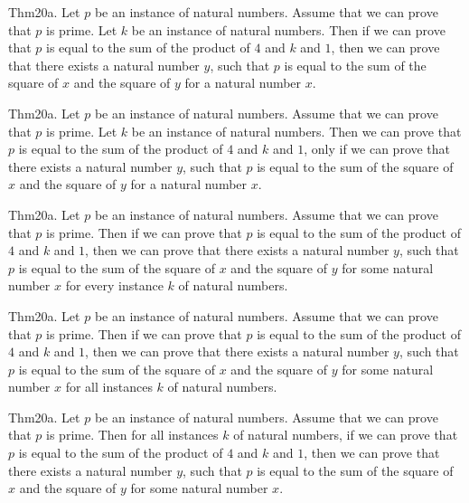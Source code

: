 \documentclass{article}
\begin{document}
Thm20a. Let $p$ be an instance of natural numbers. Assume that we can prove that $p$ is prime. Let $k$ be an instance of natural numbers. Then if we can prove that $p$ is equal to the sum of the product of $4$ and $k$ and $1$, then we can prove that there exists a natural number $y$, such that $p$ is equal to the sum of the square of $x$ and the square of $y$ for a natural number $x$.

Thm20a. Let $p$ be an instance of natural numbers. Assume that we can prove that $p$ is prime. Let $k$ be an instance of natural numbers. Then we can prove that $p$ is equal to the sum of the product of $4$ and $k$ and $1$, only if we can prove that there exists a natural number $y$, such that $p$ is equal to the sum of the square of $x$ and the square of $y$ for a natural number $x$.

Thm20a. Let $p$ be an instance of natural numbers. Assume that we can prove that $p$ is prime. Then if we can prove that $p$ is equal to the sum of the product of $4$ and $k$ and $1$, then we can prove that there exists a natural number $y$, such that $p$ is equal to the sum of the square of $x$ and the square of $y$ for some natural number $x$ for every instance $k$ of natural numbers.

Thm20a. Let $p$ be an instance of natural numbers. Assume that we can prove that $p$ is prime. Then if we can prove that $p$ is equal to the sum of the product of $4$ and $k$ and $1$, then we can prove that there exists a natural number $y$, such that $p$ is equal to the sum of the square of $x$ and the square of $y$ for some natural number $x$ for all instances $k$ of natural numbers.

Thm20a. Let $p$ be an instance of natural numbers. Assume that we can prove that $p$ is prime. Then for all instances $k$ of natural numbers, if we can prove that $p$ is equal to the sum of the product of $4$ and $k$ and $1$, then we can prove that there exists a natural number $y$, such that $p$ is equal to the sum of the square of $x$ and the square of $y$ for some natural number $x$.
\end{document}
